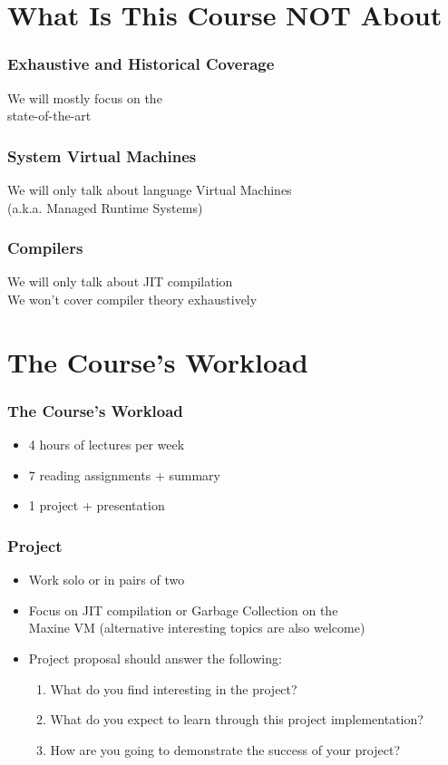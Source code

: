 \documentclass[
14pt,
aspectratio=169,
usenames,
dvipsnames,
x11names]{beamer}
\begin{document}
\section{What Is This Course NOT About}

\begin{frame}
  \frametitle{Exhaustive and Historical Coverage}
  \centering
  We will mostly focus on the\\ \alert{state-of-the-art}
\end{frame}

\begin{frame}
  \frametitle{System Virtual Machines}
  \centering
  We will only talk about \alert{language} Virtual Machines\\
  (a.k.a. Managed Runtime Systems)
\end{frame}

\begin{frame}
  \frametitle{Compilers}
  \centering
  We will only talk about \alert{JIT} compilation\\[1ex]
  We \alert{won't} cover compiler theory exhaustively
\end{frame}

\section{The Course's Workload}

\begin{frame}
  \frametitle{The Course's Workload}
  \begin{itemize}[<+->] \setlength{\itemsep}{\fill}
  \item \alert{4 hours} of lectures per week
  \item \alert{7} reading assignments + summary
  \item \alert{1} project + presentation
  \end{itemize}
\end{frame}

\begin{frame}
  \frametitle{Project}
  \begin{itemize}[<+->] \setlength{\itemsep}{\fill}
  \item Work \alert{solo} or in \alert{pairs of two}
  \item Focus on \alert{JIT compilation} or \alert{Garbage Collection} on the\\
    \alert{Maxine VM}
    (alternative interesting topics are also welcome)
  \item Project proposal should \alert{answer the following}:
    \begin{enumerate}
    \item What do you find interesting in the project?
    \item What do you expect to learn through this project implementation?
    \item How are you going to demonstrate the success of your project?
    \end{enumerate}
  \end{itemize}
\end{frame}
\end{document}
